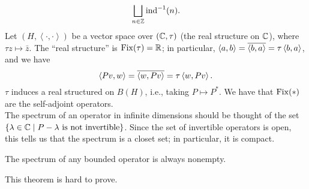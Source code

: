 \[ \bigsqcup_{n \in \mathbb Z} \operatorname{ind}^{-1}(n). \]
Let $(H, \left<\cdot,\cdot\right>)$ be a vector space over $(\mathbb C, \tau)$ (the real structure on $\mathbb C$), where $\tau z \mapsto \bar{z}$. The ``real structure'' is $\operatorname{Fix}(\tau) = \mathbb R$; in particular, $\left<a, b\right> = \overline{\left<b, a\right>} = \tau\left<b, a\right>$, and we have
\[ \left<Pv, w\right> = \overline{\left<w, Pv\right>} = \tau \left<w, Pv\right>. \]
$\tau$ induces a real structured on $B(H)$, i.e., taking $P \mapsto P^\ast$. We have that $\operatorname{Fix}(\ast)$ are the self-adjoint operators.
\\[8pt]
The spectrum of an operator in infinite dimensions should be thought of the set $\{\lambda \in \mathbb C \mid P - \lambda \text{ is not invertible}\}$. Since the set of invertible operators is open, this tells us that the spectrum is a closet set; in particular, it is compact.
\begin{theorem}
    The spectrum of any bounded operator is always nonempty.
\end{theorem}
\noindent This theorem is hard to prove.